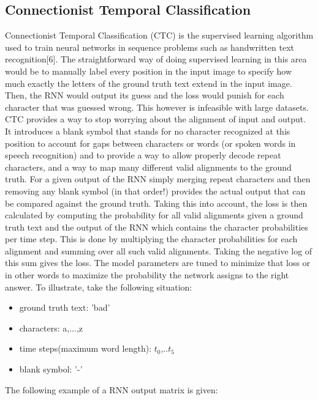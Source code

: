\documentclass{article}
\begin{document}
\subsection{Connectionist Temporal Classification}
Connectionist Temporal Classification (CTC) is the supervised learning algorithm used to train neural networks in sequence problems such as handwritten text recognition[6]. The straightforward way of doing supervised learning in this area would be to manually label every position in the input image to specify how much exactly the letters of the ground truth text extend in the input image. Then, the RNN would output its guess and the loss would punish for each character that was guessed wrong. This however is infeasible with large datasets. CTC provides a way to stop worrying about the alignment of input and output. It introduces a blank symbol that stands for no character recognized at this position to account for gaps between characters or words (or spoken words in speech recognition) and to provide a way to allow properly decode repeat characters, and a way to map many different valid alignments to the ground truth.
For a given output of the RNN simply merging repeat characters and then removing any blank symbol (in that order!) provides the actual output that can be compared against the ground truth. Taking this into account, the loss is then calculated by computing the probability for all valid alignments given a ground truth text and the output of the RNN which contains the character probabilities per time step. This is done by multiplying the character probabilities for each alignment and summing over all such valid alignments. Taking the negative log of this sum gives the loss. The model parameters are tuned to minimize that loss or in other words to maximize the probability the network assigns to the right answer. To illustrate, take the following situation:
\begin{itemize}
\item ground truth text: 'bad'
\item characters: a,...,z
\item time steps(maximum word length): \(t_0\),..\(t_5\)
\item blank symbol: '-'
\end{itemize}
The following example of a RNN output matrix is given:
\end{document}

